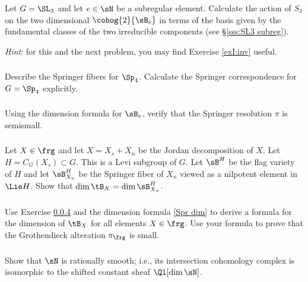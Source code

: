 \subsubsection{}\label{exI:SL3}  Let $G=\SL_{3}$ and let $e\in\sN$ be a subregular element. Calculate the action of $S_{3}$ on the two dimensional $\cohog{2}{\sB_{e}}$ in terms of the basis given by the fundamental classes of the two irreducible components (see \S\ref{sss:SL3 subreg}).

{\em Hint}: for this and the next problem, you may find Exercise \ref{exI:inv} useful.

\subsubsection{}\label{exI:Sp4} Describe the Springer fibers for $\Sp_{4}$. Calculate the Springer correspondence for $G=\Sp_{4}$ explicitly. 


\subsubsection{} Using the dimension formula for $\sB_{e}$, verify that the Springer resolution $\pi$ is semismall.

\subsubsection{}\label{exI:dim BX} Let $X\in\frg$ and let $X=X_{s}+X_{n}$ be the Jordan decomposition of $X$. Let $H=C_{G}(X_{s})\subset G$. This is a Levi subgroup of $G$. Let $\sB^{H}$ be the flag variety of $H$ and let $\sB^{H}_{X_{n}}$ be the Springer fiber of $X_{n}$ viewed as a nilpotent element in $\Lie H$. Show that $\dim\tB_{X}=\dim \sB^{H}_{X_{n}}$.


\subsubsection{} Use Exercise \ref{exI:dim BX} and the dimension formula \eqref{Spr dim} to derive a formula for the dimension of $\tB_{X}$ for all elements $X\in\frg$. Use your formula to prove that the Grothendieck alteration $\pi_{\frg}$ is small.


\subsubsection{} Show that $\sN$ is rationally smooth; i.e., its intersection cohomology complex is isomorphic to the shifted constant sheaf $\Ql[\dim\sN]$.

